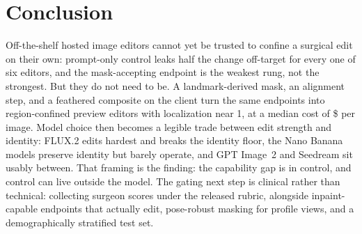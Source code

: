 \section{Conclusion}
\label{sec:conclusion}

Off-the-shelf hosted image editors cannot yet be trusted to confine a surgical
edit on their own: prompt-only control leaks half the change off-target for
every one of six editors, and the mask-accepting endpoint is the weakest rung,
not the strongest. But they do not need to be. A landmark-derived mask, an
alignment step, and a feathered composite on the client turn the same endpoints
into region-confined preview editors with localization near 1, at a median cost
of \$\MedCost{} per image. Model choice then becomes a legible trade between
edit strength and identity: FLUX.2 edits hardest and breaks the identity floor,
the Nano Banana models preserve identity but barely operate, and GPT Image~2 and
Seedream sit usably between. That framing is the finding:
the capability gap is in control, and control can live outside the model. The gating next step is clinical rather than technical: collecting
surgeon scores under the released rubric, alongside inpaint-capable endpoints
that actually edit, pose-robust masking for profile views, and a demographically
stratified test set.
